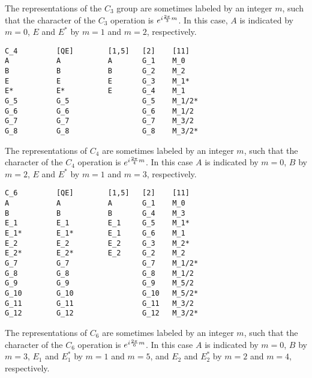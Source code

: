 \documentclass[12pt,a4paper,twoside]{report}
\begin{document}
The representations of the $C_3$ group are sometimes labeled by an integer 
$m$, such that the character of the $C_3$ operation is 
$e^{i {2\pi \over 3} m}$. In this case, $A$ is indicated by $m=0$, $E$ and 
$E^*$ by $m=1$ and $m=2$, respectively.

\begin{tcolorbox}
\begin{footnotesize}
\begin{verbatim}
C_4         [QE]        [1,5]   [2]    [11]
A           A           A       G_1    M_0
B           B           B       G_2    M_2
E           E           E       G_3    M_1*
E*          E*          E       G_4    M_1
G_5         G_5                 G_5    M_1/2*
G_6         G_6                 G_6    M_1/2
G_7         G_7                 G_7    M_3/2 
G_8         G_8                 G_8    M_3/2*
\end{verbatim}
\end{footnotesize}
\end{tcolorbox}

The representations of $C_4$ are sometimes labeled by an integer $m$,
such that the character of the $C_4$ operation is $e^{i {2\pi \over 4} m}$.
In this case $A$ is indicated by $m=0$, $B$ by $m=2$, $E$ and $E^*$ 
by $m=1$ and $m=3$, respectively.

\begin{tcolorbox}
\begin{footnotesize}
\begin{verbatim}
C_6         [QE]        [1,5]   [2]    [11]    
A           A           A       G_1    M_0
B           B           B       G_4    M_3
E_1         E_1         E_1     G_5    M_1*
E_1*        E_1*        E_1     G_6    M_1
E_2         E_2         E_2     G_3    M_2*
E_2*        E_2*        E_2     G_2    M_2
G_7         G_7                 G_7    M_1/2*
G_8         G_8                 G_8    M_1/2
G_9         G_9                 G_9    M_5/2
G_10        G_10                G_10   M_5/2*
G_11        G_11                G_11   M_3/2
G_12        G_12                G_12   M_3/2*
\end{verbatim}
\end{footnotesize}
\end{tcolorbox}

The representations of $C_6$ are sometimes labeled by an integer $m$,
such that the character of the $C_6$ operation is $e^{i {2\pi \over 6} m}$.
In this case $A$ is indicated by $m=0$, $B$ by $m=3$, $E_1$ and $E_1^*$ 
by $m=1$ and $m=5$, and $E_2$ and $E_2^*$ by $m=2$ and $m=4$, respectively.
\end{document}
